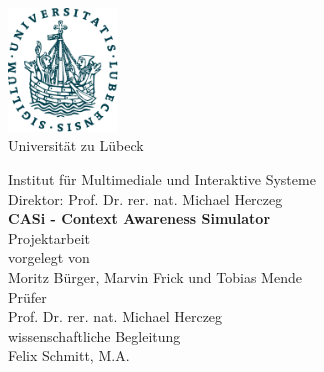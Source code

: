 \documentclass[11pt,    %
  english,ngerman,      %
  paper=a4,             %
  oneside,              %
  tablecaptionbelow,    %
  DIV=calc              %
  ]{scrbook}            %
\begin{document}
\lstset{language=Java}
\frontmatter


\thispagestyle{empty}
\vspace*{-2.2cm}
\begin{center}
  \includegraphics[width=2.9cm]{pics/uni-siegel.pdf}\\

  \vspace{.5cm}
  {
  \fontsize{16pt}{10pt}\selectfont
  Universität zu Lübeck\\
  }

  \vspace{.65cm}
  {
    \fontsize{14pt}{19pt}\selectfont
    Institut für Multimediale und Interaktive Systeme\\
    Direktor: Prof. Dr. rer. nat. Michael Herczeg\\
  }
  \vspace{2.5cm}
  {
    \fontsize{22pt}{22pt}\selectfont
    \bfseries
    CASi - Context Awareness Simulator \\}
  \vspace{1.5cm}
  {
    \fontsize{16pt}{16pt}\selectfont
    Projektarbeit\\
  }
  \vspace{1.5cm}
  {
    \fontsize{13pt}{13pt}\selectfont
    vorgelegt von\\
    \vspace{10pt}
  Moritz Bürger, Marvin Frick und Tobias Mende\\
  }
  \vspace{2.5cm}
  {
    \fontsize{13pt}{13pt}\selectfont
    Prüfer\\
    \vspace{10pt}
    Prof. Dr. rer. nat. Michael Herczeg\\
  }
  \vspace{1.5cm}
  {
    \fontsize{13pt}{13pt}\selectfont
    wissenschaftliche Begleitung\\
    \vspace{10pt}
    Felix Schmitt, M.A.
  }
\end{center}
\end{document}
